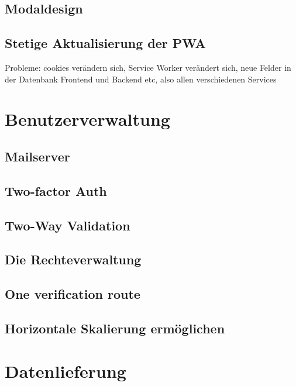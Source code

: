 \subsection{Modaldesign}

\subsection{Stetige Aktualisierung der PWA}
Probleme: cookies verändern sich, Service Worker verändert sich, neue Felder in der Datenbank
Frontend und Backend etc, also allen verschiedenen Services

\section{Benutzerverwaltung}
\subsection{Mailserver}
\subsection{Two-factor Auth}
\subsection{Two-Way Validation}
\subsection{Die Rechteverwaltung}
\subsection{One verification route}
\subsection{Horizontale Skalierung ermöglichen}


\section{Datenlieferung}


